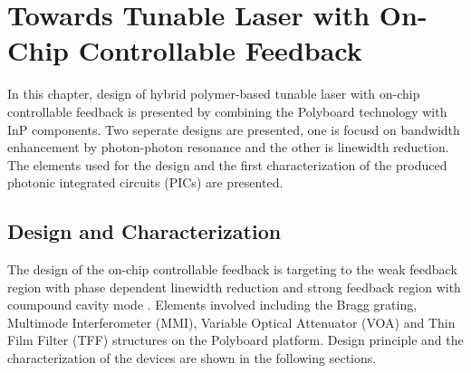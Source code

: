 \chapter{Towards Tunable Laser with On-Chip Controllable Feedback}\label{ch:Towards_laser_with_on_chip_controllable_feedback}
In this chapter, design of hybrid polymer-based tunable laser with on-chip controllable feedback is presented by combining the Polyboard technology \cite{zhang2011polymer} with InP components. Two seperate designs are presented, one is focusd on bandwidth enhancement by photon-photon resonance and the other is linewidth reduction. The elements used for the design and the first characterization of the produced photonic integrated circuits (PICs) are presented.

\section{Design and Characterization}\label{sec:design_and_characterization}
The design of the on-chip controllable feedback is targeting to the weak feedback region with phase dependent linewidth reduction and strong feedback region with coumpound cavity mode \cite{petermann2012laser,ohtsubo2012semiconductor}. Elements involved including the Bragg grating, Multimode Interferometer (MMI), Variable Optical Attenuator (VOA) and Thin Film Filter (TFF) structures on the Polyboard platform. Design principle and the characterization of the devices are shown in the following sections.


